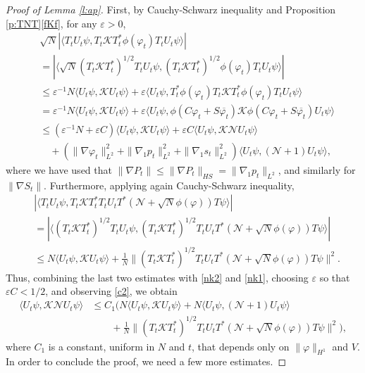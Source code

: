 \documentclass[11pt,a4paper]{scrartcl}
\newcommand{\N}{\mathcal{N}}
\newcommand{\K}{\mathcal{K}}
\begin{document}
\begin{proof}[Proof of Lemma \ref{l:ap}]
  First, by Cauchy-Schwarz inequality and Proposition \ref{p:TNT}\eqref{fKf},
  for any $\varepsilon > 0$,
  \begin{align*}
    & \sqrt{N} | \langle T_t U_t \psi, T_t \K T_t^* \phi(\varphi_t) T_t U_t
    \psi \rangle | \\
    & = | \langle \sqrt{N} (T_t \K T_t^*)^{1/2} T_t U_t \psi, (T_t \K
    T_t^*)^{1/2} \phi(\varphi_t) T_t U_t \psi \rangle | \\
    & \le \varepsilon^{-1} N \langle U_t \psi, \K U_t \psi \rangle +
    \varepsilon \langle U_t \psi, T_t^* \phi(\varphi_t) T_t \K T_t^*
    \phi(\varphi_t) T_t U_t \psi \rangle \\
    & = \varepsilon^{-1} N \langle U_t \psi, \K U_t \psi \rangle +
    \varepsilon \langle U_t \psi, \phi(C \varphi_t + S \overline{\varphi_t})
    \K \phi(C \varphi_t + S \overline{\varphi_t}) U_t \psi \rangle \\
    & \le ( \varepsilon^{-1} N + \varepsilon C) \langle U_t \psi, \K U_t \psi
    \rangle + \varepsilon C \langle U_t \psi, \K \N U_t \psi \rangle \\
    & \quad + ( \| \nabla \varphi_t \|_{L^2}^2 + \| \nabla_1 p_t \|_{L^2}^2 +
    \| \nabla_1 s_t \|_{L^2}^2) \langle U_t \psi, (\N + 1) U_t \psi \rangle,
  \end{align*}
  where we have used that $\| \nabla P_t \| \le \| \nabla P_t \|_{HS} = \|
  \nabla_1 p_t \|_{L^2}$, and similarly for $\| \nabla S_t \|$. Furthermore,
  applying again Cauchy-Schwarz inequality,
  \begin{align*}
    & | \langle T_t U_t \psi, T_t \K T_t^* T_t U_t T^* (\N + \sqrt{N}
    \phi(\varphi) ) T \psi \rangle| \\
    & = | \langle (T_t \K T_t^*)^{1/2} T_t U_t \psi, (T_t \K T_t^*)^{1/2} T_t
    U_t T^* (\N + \sqrt{N} \phi(\varphi) ) T \psi \rangle| \\
    & \le N \langle U_t \psi, \K U_t \psi \rangle + \frac{1}{N} \| (T_t \K
    T_t^*)^{1/2} T_t U_t T^* ( \N + \sqrt{N} \phi(\varphi) ) T \psi \|^2.
  \end{align*}
  Thus, combining the last two estimates with \eqref{nk2} and \eqref{nk1},
  choosing $\varepsilon$ so that $\varepsilon C < 1/2$, and observing
  \eqref{c2}, we obtain
  \begin{equation}
    \label{nk3}
    \begin{split}
      \langle U_t \psi, \K \N U_t \psi \rangle & \le C_1 \big( N \langle U_t
      \psi, \K U_t \psi \rangle + N \langle U_t \psi, (\N+1) U_t \psi \rangle
      \\
      & \qquad + \frac{1}{N} \| (T_t \K T_t^*)^{1/2} T_t U_t T^* ( \N +
      \sqrt{N} \phi(\varphi) ) T \psi \|^2 \big),
    \end{split}
  \end{equation}
  where $C_1$ is a constant, uniform in $N$ and $t$, that depends only on $\|
  \varphi \|_{H^1}$ and $V$. In order to conclude the proof, we need a few
  more estimates.


\end{proof}
\end{document}
